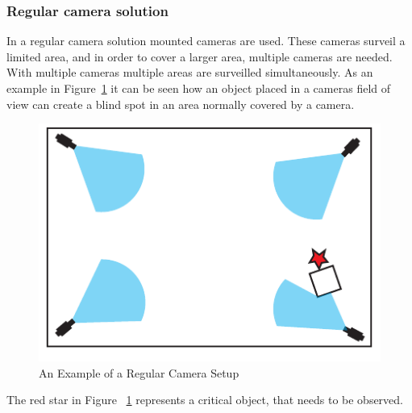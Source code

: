 \subsubsection{Regular camera solution}
In a regular camera solution mounted cameras are used.
These cameras surveil a limited area, and in order to cover a larger area, multiple cameras are needed.
With multiple cameras multiple areas are surveilled simultaneously.
As an example in Figure~\ref{fig:refular_camera_setup} it can be seen how an object placed in a cameras field of view can create a blind spot in an area normally covered by a camera.
\begin{figure}[htb]
    \centering
    \includegraphics[width=\textwidth]{gfx/regular_camera_setup.pdf}
    \caption{An Example of a Regular Camera Setup}
    \label{fig:refular_camera_setup}
\end{figure}
The red star in Figure ~\ref{fig:refular_camera_setup} represents a critical object, that needs to be observed.

